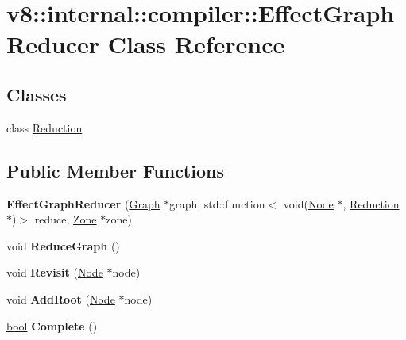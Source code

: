 \hypertarget{classv8_1_1internal_1_1compiler_1_1EffectGraphReducer}{}\section{v8\+:\+:internal\+:\+:compiler\+:\+:Effect\+Graph\+Reducer Class Reference}
\label{classv8_1_1internal_1_1compiler_1_1EffectGraphReducer}
\subsection*{Classes}
\begin{DoxyCompactItemize}
\item 
class \mbox{\hyperlink{classv8_1_1internal_1_1compiler_1_1EffectGraphReducer_1_1Reduction}{Reduction}}
\end{DoxyCompactItemize}
\subsection*{Public Member Functions}
\begin{DoxyCompactItemize}
\item 
\mbox{\label{classv8_1_1internal_1_1compiler_1_1EffectGraphReducer_a45099b0fe64c2b3bb8f0482e7b3cbda4}} 
{\bfseries Effect\+Graph\+Reducer} (\mbox{\hyperlink{classv8_1_1internal_1_1compiler_1_1Graph}{Graph}} $\ast$graph, std\+::function$<$ void(\mbox{\hyperlink{classv8_1_1internal_1_1compiler_1_1Node}{Node}} $\ast$, \mbox{\hyperlink{classv8_1_1internal_1_1compiler_1_1EffectGraphReducer_1_1Reduction}{Reduction}} $\ast$)$>$ reduce, \mbox{\hyperlink{classv8_1_1internal_1_1Zone}{Zone}} $\ast$zone)
\item 
\mbox{\label{classv8_1_1internal_1_1compiler_1_1EffectGraphReducer_a840de0732ec90d3608dc2b72668b03bd}} 
void {\bfseries Reduce\+Graph} ()
\item 
\mbox{\label{classv8_1_1internal_1_1compiler_1_1EffectGraphReducer_a258cebde0a06cbe85a9c688bb42bcf26}} 
void {\bfseries Revisit} (\mbox{\hyperlink{classv8_1_1internal_1_1compiler_1_1Node}{Node}} $\ast$node)
\item 
\mbox{\label{classv8_1_1internal_1_1compiler_1_1EffectGraphReducer_aa1922a545146a5e8e3c0d989b2139f00}} 
void {\bfseries Add\+Root} (\mbox{\hyperlink{classv8_1_1internal_1_1compiler_1_1Node}{Node}} $\ast$node)
\item 
\mbox{\label{classv8_1_1internal_1_1compiler_1_1EffectGraphReducer_a1a7bea7af1d7afe739d4f4a5cce80a3f}} 
\mbox{\hyperlink{classbool}{bool}} {\bfseries Complete} ()
\end{DoxyCompactItemize}


